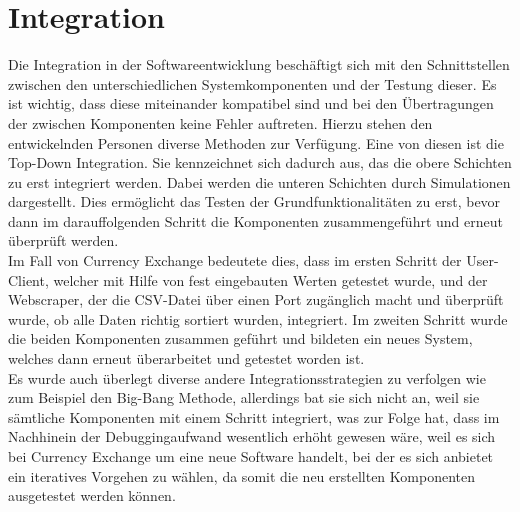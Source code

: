 \documentclass[conference]{IEEEtran}
\begin{document}
\section{Integration}
Die Integration in der Softwareentwicklung beschäftigt sich mit den Schnittstellen zwischen den unterschiedlichen Systemkomponenten und der Testung dieser. Es ist wichtig, dass diese miteinander kompatibel sind und bei den Übertragungen der zwischen Komponenten keine Fehler auftreten. Hierzu stehen den entwickelnden Personen diverse Methoden zur Verfügung. Eine von diesen ist die Top-Down Integration. Sie kennzeichnet sich dadurch aus, das die obere Schichten zu erst integriert werden. Dabei werden die unteren Schichten durch Simulationen dargestellt. Dies ermöglicht das Testen der Grundfunktionalitäten zu erst, bevor dann im darauffolgenden Schritt die Komponenten zusammengeführt und erneut überprüft werden.\\
Im Fall von Currency Exchange bedeutete dies, dass im ersten Schritt der User-Client, welcher mit Hilfe von fest eingebauten Werten getestet wurde, und der Webscraper, der die CSV-Datei über einen Port zugänglich macht und überprüft wurde, ob alle Daten richtig sortiert wurden, integriert. Im zweiten Schritt wurde die beiden Komponenten zusammen geführt und bildeten ein neues System, welches dann erneut überarbeitet und getestet worden ist. \\
Es wurde auch überlegt diverse andere Integrationsstrategien zu verfolgen wie zum Beispiel den Big-Bang Methode, allerdings bat sie sich nicht an, weil sie sämtliche Komponenten mit einem Schritt integriert, was zur Folge hat, dass im Nachhinein der Debuggingaufwand wesentlich erhöht gewesen wäre, weil es sich bei Currency Exchange um eine neue Software handelt, bei der es sich anbietet ein iteratives Vorgehen zu wählen, da somit die neu erstellten Komponenten ausgetestet werden können.
\end{document}
